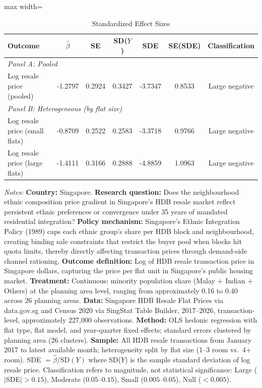\begin{table}[t]
\centering
\caption{Standardized Effect Sizes}
\label{tab:sde}
\begin{adjustbox}{max width=\textwidth}
\begin{tabular}{lcccccc}
\hline\hline
Outcome & $\hat{\beta}$ & SE & SD($Y$) & SDE & SE(SDE) & Classification \\
\hline
\multicolumn{7}{l}{\textit{Panel A: Pooled}} \\
Log resale price (pooled) & -1.2797 & 0.2924 & 0.3427 & -3.7347 & 0.8533 & Large negative \\
\hline
\multicolumn{7}{l}{\textit{Panel B: Heterogeneous (by flat size)}} \\
Log resale price (small flats) & -0.8709 & 0.2522 & 0.2583 & -3.3718 & 0.9766 & Large negative \\
Log resale price (large flats) & -1.4111 & 0.3166 & 0.2888 & -4.8859 & 1.0963 & Large negative \\
\hline\hline
\end{tabular}
\end{adjustbox}
\begin{tablenotes}[flushleft]\footnotesize
\item \textit{Notes:} \textbf{Country:} Singapore. \textbf{Research question:} Does the neighbourhood ethnic composition price gradient in Singapore's HDB resale market reflect persistent ethnic preferences or convergence under 35 years of mandated residential integration? \textbf{Policy mechanism:} Singapore's Ethnic Integration Policy (1989) caps each ethnic group's share per HDB block and neighbourhood, creating binding sale constraints that restrict the buyer pool when blocks hit quota limits, thereby directly affecting transaction prices through demand-side channel rationing. \textbf{Outcome definition:} Log of HDB resale transaction price in Singapore dollars, capturing the price per flat unit in Singapore's public housing market. \textbf{Treatment:} Continuous: minority population share (Malay + Indian + Others) at the planning area level, ranging from approximately 0.16 to 0.40 across 26 planning areas. \textbf{Data:} Singapore HDB Resale Flat Prices via data.gov.sg and Census 2020 via SingStat Table Builder, 2017--2026, transaction-level, approximately 227,000 observations. \textbf{Method:} OLS hedonic regression with flat type, flat model, and year-quarter fixed effects; standard errors clustered by planning area (26 clusters). \textbf{Sample:} All HDB resale transactions from January 2017 to latest available month; heterogeneity split by flat size (1--3 room vs.\ 4+ room). SDE $= \hat{\beta} / \text{SD}(Y)$ where SD($Y$) is the sample standard deviation of log resale price. Classification refers to magnitude, not statistical significance: Large ($|$SDE$| > 0.15$), Moderate ($0.05$--$0.15$), Small ($0.005$--$0.05$), Null ($< 0.005$).
\end{tablenotes}
\end{table}

